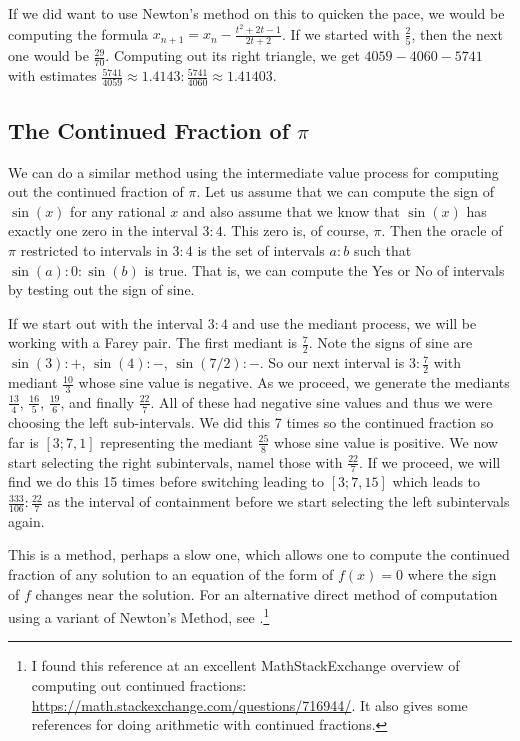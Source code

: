 \documentclass[12pt]{article}
\theoremstyle{remark}
\begin{document}
If we did want to use Newton's method on this to quicken the pace, we would be computing the formula $x_{n+1} = x_n - \frac{ t^2  + 2t -1}{2t + 2}$. If we started with $\frac{2}{5}$, then the next one would be $\frac{29}{70}$. Computing out its right triangle, we get $4059-4060-5741$ with estimates $\frac{5741}{4059}\approx 1.4143: \frac{5741}{4060} \approx 1.41403$. 

\subsection{The Continued Fraction of $\pi$}

We can do a similar method using the intermediate value process for computing out the continued fraction of $\pi$. Let us assume that we can compute the sign of $\sin(x)$ for any rational $x$ and also assume that we know that $\sin(x)$ has exactly one zero in the interval $3:4$. This zero is, of course, $\pi$. Then the oracle of $\pi$ restricted to intervals in $3:4$ is the set of intervals $a:b$ such that $\sin(a):0:\sin(b)$ is true. That is, we can compute the Yes or No of intervals by testing out the sign of sine. 

If we start out with the interval  $3:4$ and use the mediant process, we will be working with a Farey pair. The first mediant is $\frac{7}{2}$. Note the signs of sine are  $\sin(3) : +$, $\sin(4): -$, $\sin(7/2): -$. So our next interval is $3:\frac{7}{2}$ with mediant $\frac{10}{3}$ whose sine value is negative. As we proceed, we generate the mediants $\frac{13}{4}$, $\frac{16}{5}$, $\frac{19}{6}$, and finally $\frac{22}{7}$. All of these had negative sine values and thus we were choosing the left sub-intervals. We did this 7 times so the continued fraction so far is $[3;7,1]$ representing the mediant $\frac{25}{8}$ whose sine value is positive. We now start selecting the right subintervals, namel those with $\frac{22}{7}$. If we proceed, we will find we do this 15 times before switching leading to $[3; 7, 15]$ which leads to $\frac{333}{106}:\frac{22}{7}$ as the interval of containment before we start selecting the left subintervals again.

This is a method, perhaps a slow one, which allows one to compute the continued fraction of any solution to an equation of the form of $f(x) =0$ where the sign of $f$ changes near the solution. For an alternative direct method of computation using a variant of Newton's Method, see \cite{shiu95}.\footnote{I found this reference at an excellent MathStackExchange overview of computing out continued fractions: \url{https://math.stackexchange.com/questions/716944/}.  It also gives some references for doing arithmetic with continued fractions.} 
\end{document}
